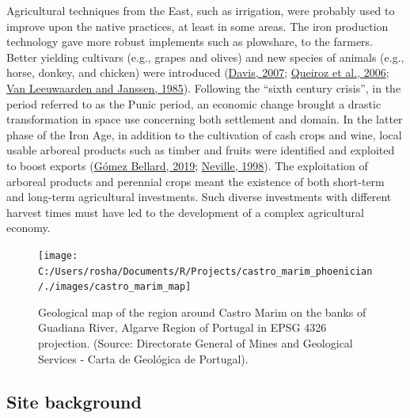 \documentclass[preprint, 3p, authoryear]{elsarticle} %
\begin{document}
Agricultural techniques from the East, such as irrigation, were probably used to improve upon the native practices, at least in some areas. The iron production technology gave more robust implements such as plowshare, to the farmers. Better yielding cultivars (e.g., grapes and olives) and new species of animals (e.g., horse, donkey, and chicken) were introduced (\protect\hyperlink{ref-davis07}{Davis, 2007}; \protect\hyperlink{ref-queiroz_etal06}{Queiroz et al., 2006}; \protect\hyperlink{ref-vanleeuwaarden_janssen85}{Van Leeuwaarden and Janssen, 1985}). Following the ``sixth century crisis'', in the period referred to as the Punic period, an economic change brought a drastic transformation in space use concerning both settlement and domain. In the latter phase of the Iron Age, in addition to the cultivation of cash crops and wine, local usable arboreal products such as timber and fruits were identified and exploited to boost exports (\protect\hyperlink{ref-gomezbellard19}{Gómez Bellard, 2019}; \protect\hyperlink{ref-neville98}{Neville, 1998}). The exploitation of arboreal products and perennial crops meant the existence of both short-term and long-term agricultural investments. Such diverse investments with different harvest times must have led to the development of a complex agricultural economy.

\begin{figure}
\texttt{[image: C:/Users/rosha/Documents/R/Projects/castro\_marim\_phoenician/./images/castro\_marim\_map]} \caption{Geological map of the region around Castro Marim on the banks of Guadiana River, Algarve Region of Portugal in EPSG 4326 projection. (Source: Directorate General of Mines and Geological Services - Carta de Geológica de Portugal).}\label{fig:castro-marim-loc}
\end{figure}

\hypertarget{site-background}{%
\subsection{Site background}\label{site-background}}
\end{document}
